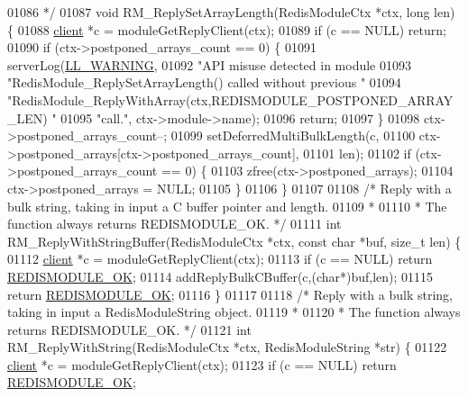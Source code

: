 \begin{DoxyCode}
{{01086 \textcolor{comment}{ */}
01087 \textcolor{keywordtype}{void} RM\_ReplySetArrayLength(RedisModuleCtx *ctx, \textcolor{keywordtype}{long} len) \{
01088     \hyperlink{structclient}{client} *c = moduleGetReplyClient(ctx);
01089     \textcolor{keywordflow}{if} (c == NULL) \textcolor{keywordflow}{return};
01090     \textcolor{keywordflow}{if} (ctx->postponed\_arrays\_count == 0) \{
01091         serverLog(\hyperlink{server_8h_a31229b9334bba7d6be2a72970967a14b}{LL\_WARNING},
01092             \textcolor{stringliteral}{"API misuse detected in module %
01093             \textcolor{stringliteral}{"RedisModule\_ReplySetArrayLength() called without previous "}
01094             \textcolor{stringliteral}{"RedisModule\_ReplyWithArray(ctx,REDISMODULE\_POSTPONED\_ARRAY\_LEN) "}
01095             \textcolor{stringliteral}{"call."}, ctx->module->name);
01096             \textcolor{keywordflow}{return};
01097     \}
01098     ctx->postponed\_arrays\_count--;
01099     setDeferredMultiBulkLength(c,
01100             ctx->postponed\_arrays[ctx->postponed\_arrays\_count],
01101             len);
01102     \textcolor{keywordflow}{if} (ctx->postponed\_arrays\_count == 0) \{
01103         zfree(ctx->postponed\_arrays);
01104         ctx->postponed\_arrays = NULL;
01105     \}
01106 \}
01107 
01108 \textcolor{comment}{/* Reply with a bulk string, taking in input a C buffer pointer and length.}
01109 \textcolor{comment}{ *}
01110 \textcolor{comment}{ * The function always returns REDISMODULE\_OK. */}
01111 \textcolor{keywordtype}{int} RM\_ReplyWithStringBuffer(RedisModuleCtx *ctx, \textcolor{keyword}{const} \textcolor{keywordtype}{char} *buf, size\_t len) \{
01112     \hyperlink{structclient}{client} *c = moduleGetReplyClient(ctx);
01113     \textcolor{keywordflow}{if} (c == NULL) \textcolor{keywordflow}{return} \hyperlink{redismodule_8h_a1bc5bfd69abcd378ff52c640adc5418d}{REDISMODULE\_OK};
01114     addReplyBulkCBuffer(c,(\textcolor{keywordtype}{char}*)buf,len);
01115     \textcolor{keywordflow}{return} \hyperlink{redismodule_8h_a1bc5bfd69abcd378ff52c640adc5418d}{REDISMODULE\_OK};
01116 \}
01117 
01118 \textcolor{comment}{/* Reply with a bulk string, taking in input a RedisModuleString object.}
01119 \textcolor{comment}{ *}
01120 \textcolor{comment}{ * The function always returns REDISMODULE\_OK. */}
01121 \textcolor{keywordtype}{int} RM\_ReplyWithString(RedisModuleCtx *ctx, RedisModuleString *str) \{
01122     \hyperlink{structclient}{client} *c = moduleGetReplyClient(ctx);
01123     \textcolor{keywordflow}{if} (c == NULL) \textcolor{keywordflow}{return} \hyperlink{redismodule_8h_a1bc5bfd69abcd378ff52c640adc5418d}{REDISMODULE\_OK};
}}}
\end{DoxyCode}
